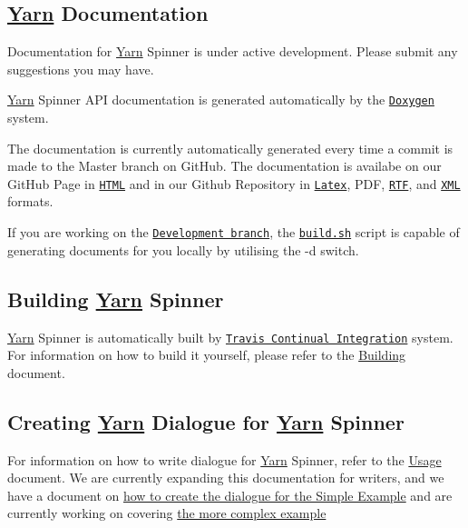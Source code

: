 \subsection*{\hyperlink{a00045}{Yarn} Documentation}

Documentation for \hyperlink{a00045}{Yarn} Spinner is under active development. Please submit any suggestions you may have.

\hyperlink{a00045}{Yarn} Spinner A\-P\-I documentation is generated automatically by the \href{http://www.doxygen.org}{\tt Doxygen} system.

The documentation is currently automatically generated every time a commit is made to the Master branch on Git\-Hub. The documentation is availabe on our Git\-Hub Page in \href{http://thesecretlab.github.io/YarnSpinner/html/}{\tt H\-T\-M\-L} and in our Github Repository in \href{https://github.com/thesecretlab/YarnSpinner/tree/gh-pages/latex}{\tt Latex}, P\-D\-F, \href{https://github.com/thesecretlab/YarnSpinner/tree/gh-pages/rtf}{\tt R\-T\-F}, and \href{https://github.com/thesecretlab/YarnSpinner/tree/gh-pages/xml}{\tt X\-M\-L} formats.

If you are working on the \href{https://github.com/thesecretlab/YarnSpinner/tree/development}{\tt Development branch}, the \href{../build.sh}{\tt build.\-sh} script is capable of generating documents for you locally by utilising the -\/d switch.

\subsection*{Building \hyperlink{a00045}{Yarn} Spinner}

\hyperlink{a00045}{Yarn} Spinner is automatically built by \href{https://travis-ci.org/thesecretlab/YarnSpinner}{\tt Travis Continual Integration} system. For information on how to build it yourself, please refer to the \hyperlink{a00209}{Building} document.

\subsection*{Creating \hyperlink{a00045}{Yarn} Dialogue for \hyperlink{a00045}{Yarn} Spinner}

For information on how to write dialogue for \hyperlink{a00045}{Yarn} Spinner, refer to the \hyperlink{a00202}{Usage} document. We are currently expanding this documentation for writers, and we have a document on \hyperlink{a00206}{how to create the dialogue for the Simple Example} and are currently working on covering \hyperlink{a00203}{the more complex example}

